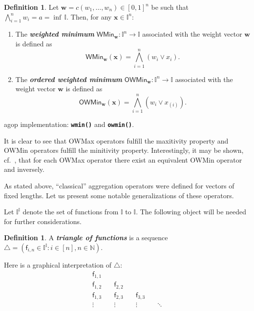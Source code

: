 \documentclass[11pt]{article}\usepackage[]{graphicx}\usepackage[]{color}
\newcommand{\hlkwd}[1]{\textcolor[rgb]{0.737,0.353,0.396}{\textbf{#1}}}%
\renewcommand{\emph}[1]{\textbf{\textsl{#1}}}
\newcommand{\package}[1]{\textsf{#1}\xspace}
\newcommand{\Rfunc}[1]{\texttt{\hlkwd{#1}}}
\newcommand{\vect}[1]{{\mathbf{#1}}}
\newcommand{\func}[1]{{\mathsf{#1}}}
\newcommand{\Naturals}{\mathbb{N}}
\newcommand{\Ival}{\mathbb{I}}
\newcommand{\IvalPow}[1]{\mathbb{I}^{#1}}
\theoremstyle{remark}
\theoremstyle{definition}
\newtheorem{definition}[theorem]{Definition}
\begin{document}
\medskip
\begin{definition}
Let  $\vect{w}=c(w_{1},\dots,w_{n})\in[0,1]^{n}$ be such that
$\bigwedge_{i=1}^{n} w_{i}=a=\inf\,\Ival$.
Then, for any $\vect{x}\in\IvalPow{n}$:

\begin{enumerate}
\item The \emph{weighted minimum} $\func{WMin}_\vect{w}: \IvalPow{n}\to\Ival$ associated
with the weight vector $\vect{w}$ is defined as
\[\func{WMin}_\vect{w}(\vect{x})=\bigwedge_{i=1}^{n}(w_{i}\vee x_{i}).\]

\item The \emph{ordered weighted minimum} $\func{OWMin}_\vect{w}: \IvalPow{n}\to\Ival$ associated
with the weight vector $\vect{w}$ is defined as
\[\func{OWMin}_\vect{w}(\vect{x})=\bigwedge_{i=1}^{n}(w_{i}\vee x_{(i)}).\]
\end{enumerate}
\end{definition}

\noindent
\package{agop} implementation: \index{\Rfunc{wmin()}}\Rfunc{wmin()}
and \index{\Rfunc{owmin()}}\Rfunc{owmin()}.

It is clear to see that OWMax operators fulfill the maxitivity property and
OWMin operators fulfill the minitivity property. Interestingly,
it may be shown, cf.~\cite{GrabischETAL2009:aggregationfunctions},
that for each OWMax operator there exist an equivalent OWMin
operator and inversely.


\bigskip
As stated above, ``classical'' aggregation operators
were defined for vectors of fixed lengths.
Let us present some notable generalizations of these operators.

Let $\IvalPow{\Ival}$ denote the set of functions from $\Ival$ to $\Ival$.
The following object will be needed for further considerations.
\begin{definition}
A \emph{triangle of functions}
is a sequence $\triangle=(\func{f}_{i,n}\in\IvalPow{\Ival}: i\in [n], n\in\Naturals)$.
\end{definition}
Here is a graphical interpretation of $\triangle$:
\begin{equation*}
\begin{array}{cccc}
\func{f}_{1,1} &&&\\
\func{f}_{1,2} &\quad \func{f}_{2,2}&& \\
\func{f}_{1,3} &\quad \func{f}_{2,3}& \quad \func{f}_{3,3}& \\
\vdots  &\quad\vdots  &\quad\vdots   & \quad\ddots\\
\end{array}
\end{equation*}
\end{document}
